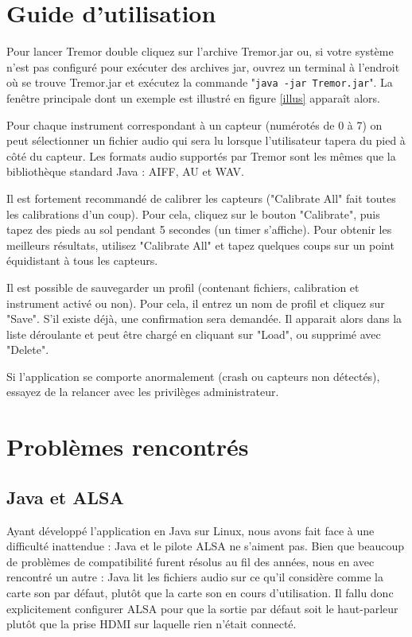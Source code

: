 \documentclass[11pt,a4paper,twoside,svgnames]{article}
\begin{document}
	\section{Guide d'utilisation}
	Pour lancer Tremor double cliquez sur l'archive Tremor.jar ou, si votre système n'est pas configuré pour exécuter des archives jar, ouvrez un terminal à l'endroit où se trouve Tremor.jar et exécutez la commande "\texttt{java -jar Tremor.jar}". La fenêtre principale dont un exemple est illustré en figure \ref{illus} apparaît alors.
	

	
	Pour chaque instrument correspondant à un capteur (numérotés de 0 à 7) on peut sélectionner un fichier audio qui sera lu lorsque l'utilisateur tapera du pied à côté du capteur. Les formats audio supportés par Tremor sont les mêmes que la bibliothèque standard Java : AIFF, AU et WAV.
	
	Il est fortement recommandé de calibrer les capteurs ("Calibrate All" fait toutes les calibrations d'un coup). Pour cela, cliquez sur le bouton "Calibrate", puis tapez des pieds au sol pendant 5 secondes (un timer s'affiche). Pour obtenir les meilleurs résultats, utilisez "Calibrate All" et tapez quelques coups sur un point équidistant à tous les capteurs.
	
	Il est possible de sauvegarder un profil (contenant fichiers, calibration et instrument activé ou non). Pour cela, il entrez un nom de profil et cliquez sur "Save". S'il existe déjà, une confirmation sera demandée. Il apparait alors dans la liste déroulante et peut être chargé en cliquant sur "Load", ou supprimé avec "Delete".
	
	Si l'application se comporte anormalement (crash ou capteurs non détectés), essayez de la relancer avec les privilèges administrateur.
	
	\section{Problèmes rencontrés}
	\subsection{Java et ALSA}
	Ayant développé l'application en Java sur Linux, nous avons fait face à une difficulté inattendue : Java et le pilote ALSA ne s'aiment pas. Bien que beaucoup de problèmes de compatibilité furent résolus au fil des années, nous en avec rencontré un autre : Java lit les fichiers audio sur ce qu'il considère comme la carte son par défaut, plutôt que la carte son en cours d'utilisation. Il fallu donc explicitement configurer ALSA pour que la sortie par défaut soit le haut-parleur plutôt que la prise HDMI sur laquelle rien n'était connecté.
	
\end{document}
